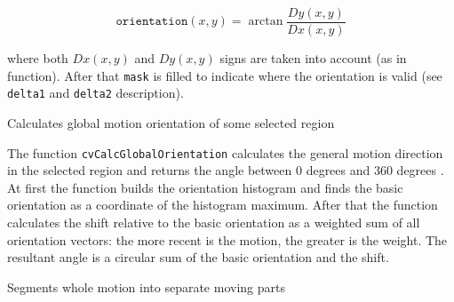 \[
\texttt{orientation}(x,y)=\arctan{\frac{Dy(x,y)}{Dx(x,y)}}
\]

where both $Dx(x,y)$ and $Dy(x,y)$ signs are taken into account (as in  function). After that \texttt{mask} is filled to indicate where the orientation is valid (see \texttt{delta1} and \texttt{delta2} description).

\label{CalcGlobalOrientation}

Calculates global motion orientation of some selected region


\begin{description}
\end{description}

The function \texttt{cvCalcGlobalOrientation} calculates the general
motion direction in the selected region and returns the angle between
0 degrees  and 360 degrees . At first the function builds the orientation histogram
and finds the basic orientation as a coordinate of the histogram
maximum. After that the function calculates the shift relative to the
basic orientation as a weighted sum of all orientation vectors: the more
recent is the motion, the greater is the weight. The resultant angle is
a circular sum of the basic orientation and the shift.

\label{SegmentMotion}

Segments whole motion into separate moving parts

